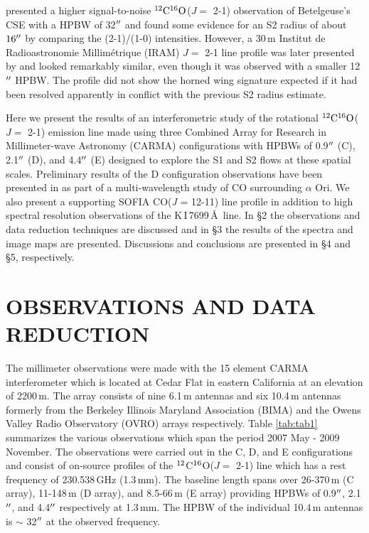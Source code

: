 \documentclass[iop]{emulateapj}
\begin{document}
\cite{1987ApJ...313..400H} presented a higher signal-to-noise $\rm{{}^{12}C^{16}O}$($J=$ 2-1) observation of Betelgeuse's CSE with a HPBW of 32$\mbox{$^{\prime\prime}$}$ and found some evidence for an S2 radius of about $16\mbox{$^{\prime\prime}$}$ by comparing the  (2-1)/(1-0) intensities. However,  a 30\,m Institut de Radioastronomie Millim\'etrique (IRAM) $J=$ 2-1 line profile was later presented by  \cite{1994ApJ...424L.127H} and looked remarkably similar, even though it was observed with a smaller 12$\mbox{$^{\prime\prime}$}$ HPBW. The profile did not show the horned wing signature expected if it had been resolved apparently in conflict with the previous S2 radius estimate.

Here we present the results of an interferometric study of the rotational $\rm{{}^{12}C^{16}O}$($J=$ 2-1) emission line made using three Combined Array for Research in Millimeter-wave Astronomy (CARMA) configurations with HPBWs of 0.9$\mbox{$^{\prime\prime}$}$ (C), 2.1$\mbox{$^{\prime\prime}$}$ (D), and 4.4$\mbox{$^{\prime\prime}$}$ (E) designed to explore the S1 and S2 flows at these spatial scales. Preliminary results of the D configuration observations have been presented in \cite{2009AIPC.1094..868H} as part of a multi-wavelength study of CO surrounding $\alpha$ Ori. We also present a supporting SOFIA CO(\textit{J} = 12-11) line profile in addition to high spectral resolution observations of the K\,I\,7699\,\AA \ line. In \S2 the observations and data reduction techniques are discussed and in \S3 the results of the spectra and image maps are presented. Discussions and conclusions are presented in \S4 and \S5, respectively.

\section{OBSERVATIONS AND DATA REDUCTION}

The millimeter observations were made with the 15 element CARMA interferometer \citep{2004ASPC..314..768S} which is located at Cedar Flat in eastern California at an elevation of 2200\,m. The array consists of nine 6.1\,m antennas and six 10.4\,m antennas formerly from the Berkeley Illinois Maryland Association (BIMA) and the Owens Valley Radio Observatory (OVRO) arrays respectively. Table \ref{tab:tab1} summarizes the various observations which span the period 2007 May - 2009 November. The observations were carried out in the C, D, and E configurations and consist of on-source profiles of the $\rm{{}^{12}}$C$\rm{{}^{16}}$O($J=$ 2-1) line which has a rest frequency of 230.538\,GHz (1.3\,mm). The baseline length spans over 26-370\,m (C array), 11-148\,m (D array), and 8.5-66\,m (E array) providing HPBWs of 0.9$\mbox{$^{\prime\prime}$}$, 2.1$\mbox{$^{\prime\prime}$}$, and 4.4$\mbox{$^{\prime\prime}$}$ respectively at 1.3\,mm. The HPBW of the individual 10.4\,m antennas is $\sim$ 32$\mbox{$^{\prime\prime}$}$ at the observed frequency.
\end{document}
